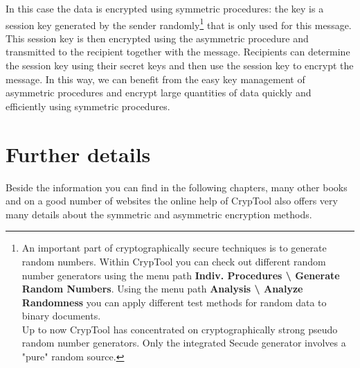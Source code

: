 In this case the data is encrypted using symmetric procedures: the key is a
session key generated by the sender
randomly\footnote{%
An important part of cryptographically secure techniques is to generate 
random numbers. Within CrypTool you can check out
different random number generators using the menu path
{\bf Indiv. Procedures \textbackslash{} Generate Random Numbers}. 
Using the menu path {\bf Analysis \textbackslash{} Analyze Randomness}
you can apply different test methods for random data to binary documents. \\
Up to now CrypTool has concentrated on cryptographically strong 
pseudo random number generators. Only the integrated Secude
generator involves a "pure" random source. 
}
that is only used for this message.
This session key is then encrypted using the asymmetric procedure and
transmitted to the recipient together with the message. Recipients can determine
the session key using their secret keys and then use the session key to encrypt
the message. In this way, we can benefit from the easy key management
 of asymmetric procedures and encrypt large quantities of data
quickly and efficiently using symmetric procedures.


\section{Further details}

Beside the information you can find in the following chapters, many other
books and on a good number of websites the online help of 
CrypTool also offers very many details about the 
symmetric and asymmetric encryption methods.


